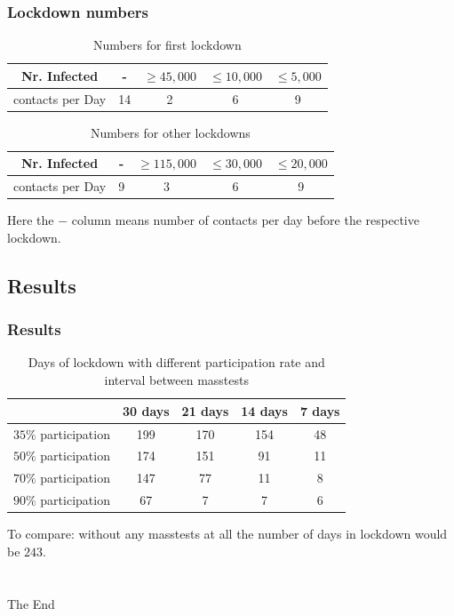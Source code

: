\documentclass{beamer}
\begin{document}
\begin{frame}
  \frametitle{Lockdown numbers}

  \begin{table}[!h]
  \begin{center}
  \begin{tabular}{|c||c|c|c|c|}
  \hline
    Nr. Infected &- & $\geq 45,000$ & $\leq 10,000$ & $\leq 5,000$ \\
    \hline
    contacts per Day & 14 & 2 & 6 & 9 \\
    \hline
  \end{tabular}
  \end{center}
  \caption{Numbers for first lockdown}
  \end{table}

  \begin{table}[!h]
  \begin{center}
  \begin{tabular}{|c||c|c|c|c|}
  \hline
    Nr. Infected &- & $\geq 115,000$ & $\leq 30,000$ & $\leq 20,000$ \\
    \hline
    contacts per Day & 9 & 3 & 6 & 9 \\
    \hline
  \end{tabular}
  \end{center}
  \caption{Numbers for other lockdowns}
  \end{table}

  Here the $-$ column means number of contacts per day before the respective lockdown.
\end{frame}

\subsection{Results}

\begin{frame}
\frametitle{Results}

\begin{table}[!h]
{\small%
\begin{center}
\begin{tabular}{|c||c|c|c|c|}
 \hline
 & 30 days    & 21 days   & 14 days  & 7 days  \\
  \hline
  \hline
      $35\%$ participation    & 199 &  170&  154  & 48   \\
  \hline
      $50\%$ participation & 174 & 151 & 91 & 11 \\
  \hline
      $70\%$ participation & 147 &  77 & 11 & 8 \\
  \hline
      $90\%$ participation & 67 &7 &7  & 6\\
      \hline
\end{tabular}
\end{center}
}%

\caption{Days of lockdown with different participation rate and interval between masstests}
\end{table}
To compare: without any masstests at all the number of days in lockdown would be $243$.
\end{frame}
\section{}
\begin{frame}
\Huge{\centerline{The End}}
\end{frame}

\end{document}
